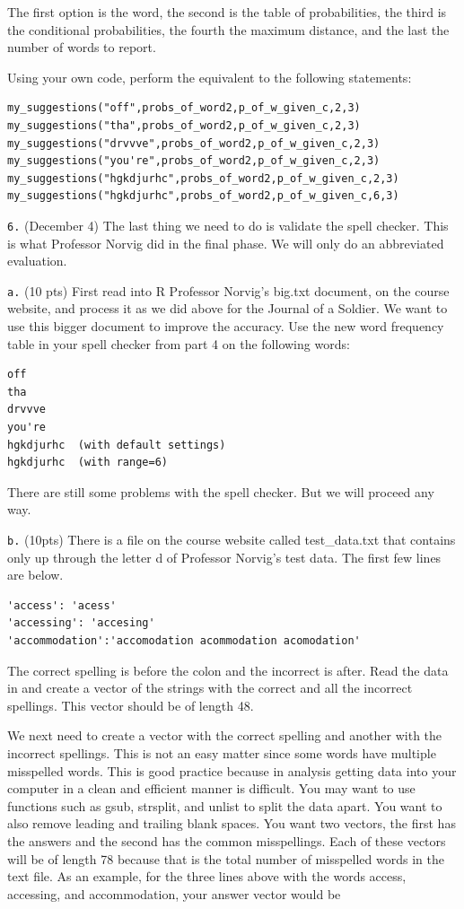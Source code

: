 \documentclass[]{book}
\theoremstyle{definition}
\theoremstyle{definition}
\theoremstyle{definition}
\theoremstyle{remark}
\begin{document}
The first option is the word, the second is the table of probabilities,
the third is the conditional probabilities, the fourth the maximum
distance, and the last the number of words to report.

Using your own code, perform the equivalent to the following statements:

\begin{verbatim}
my_suggestions("off",probs_of_word2,p_of_w_given_c,2,3)
my_suggestions("tha",probs_of_word2,p_of_w_given_c,2,3)
my_suggestions("drvvve",probs_of_word2,p_of_w_given_c,2,3)
my_suggestions("you're",probs_of_word2,p_of_w_given_c,2,3)
my_suggestions("hgkdjurhc",probs_of_word2,p_of_w_given_c,2,3)
my_suggestions("hgkdjurhc",probs_of_word2,p_of_w_given_c,6,3)
\end{verbatim}

\texttt{6.} (December 4) The last thing we need to do is validate the
spell checker. This is what Professor Norvig did in the final phase. We
will only do an abbreviated evaluation.

\texttt{a.} (10 pts) First read into R Professor Norvig's big.txt
document, on the course website, and process it as we did above for the
Journal of a Soldier. We want to use this bigger document to improve the
accuracy. Use the new word frequency table in your spell checker from
part 4 on the following words:

\begin{verbatim}
off  
tha  
drvvve  
you're
hgkdjurhc  (with default settings) 
hgkdjurhc  (with range=6)  
\end{verbatim}

There are still some problems with the spell checker. But we will
proceed any way.

\texttt{b.} (10pts) There is a file on the course website called
test\_data.txt that contains only up through the letter d of Professor
Norvig's test data. The first few lines are below.

\begin{verbatim}
'access': 'acess' 
'accessing': 'accesing' 
'accommodation':'accomodation acommodation acomodation' 
\end{verbatim}

The correct spelling is before the colon and the incorrect is after.
Read the data in and create a vector of the strings with the correct and
all the incorrect spellings. This vector should be of length 48.

We next need to create a vector with the correct spelling and another
with the incorrect spellings. This is not an easy matter since some
words have multiple misspelled words. This is good practice because in
analysis getting data into your computer in a clean and efficient manner
is difficult. You may want to use functions such as gsub, strsplit, and
unlist to split the data apart. You want to also remove leading and
trailing blank spaces. You want two vectors, the first has the answers
and the second has the common misspellings. Each of these vectors will
be of length 78 because that is the total number of misspelled words in
the text file. As an example, for the three lines above with the words
access, accessing, and accommodation, your answer vector would be
\end{document}
